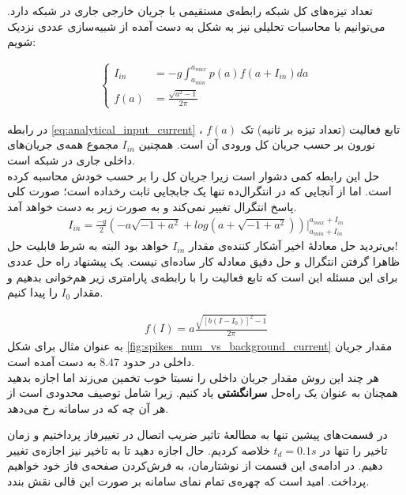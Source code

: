 تعداد تیزه‌های کل شبکه رابطه‌ی مستقیمی با جریان خارجی جاری در شبکه دارد. می‌توانیم با محاسبات تحلیلی نیز به شکل به دست آمده از شبیه‌سازی عددی نزدیک شویم:

\begin{align}
	\begin{cases}
		I_{in} &= -g \int_{a_{min}}^{a_{max}} p(a) f(a + I_{in}) da \\
		f(a) &= \frac{\sqrt{a^2 - 1}}{2\pi}
	\end{cases}
	\label{eq:analytical_input_current}
\end{align}

در رابطه \ref{eq:analytical_input_current} ، $f(a)$ تابع فعالیت (تعداد تیزه بر ثانیه) تک نورون بر حسب جریان کل ورودی آن است. همچنین $I_{in}$ مجموع همه‌ی جریان‌های داخلی جاری در شبکه است.\\

حل این رابطه کمی دشوار است زیرا جریان کل را بر حسب خودش محاسبه کرده است. اما از آنجایی که در انتگرال‌ده تنها یک جابجایی ثابت رخداده است؛ صورت کلی پاسخ انتگرال تغییر نمی‌کند و به صورت زیر به دست خواهد آمد.
\begin{align}
	I_{in} = \frac{-g}{2} (-a \sqrt{-1 + a^2} + log(a + \sqrt{-1 + a^2})) \Big|_{a_{min} + I_{in}}^{a_{max} + I_{in}}
\end{align}
بی‌تردید حل معادلهٔ اخیر آشکار کننده‌ی مقدار
$I_{in}$
خواهد بود البته به شرط قابلیت حل!\\

ظاهرا گرفتن انتگرال و حل دقیق معادله کار ساده‌ای نیست. یک پیشنهاد راه حل عددی برای این مسئله این است که تابع فعالیت را با رابطه‌ی پارامتری زیر هم‌خوانی بدهیم و مقدار 
$I_0$
را پیدا کنیم.

\begin{align}
	f(I) = a \frac{\sqrt{[b(I - I_0 )]^2 - 1}}{2\pi}
\end{align}
به عنوان مثال برای شکل
\ref{fig:spikes_num_vs_background_current}
مقدار جریان داخلی در حدود 
$8.47$
به دست آمده است.\\

هر چند این روش مقدار جریان داخلی را نسبتا خوب تخمین می‌زند اما اجازه بدهید همچنان به عنوان یک راه‌حل 
\textbf{
سرانگشتی
}
یاد کنیم. زیرا شامل توصیف محدودی است از هر آن چه که در سامانه رخ می‌دهد.

در قسمت‌های پیشین تنها به مطالعهٔ تاثیر ضریب اتصال در تغییرفاز پرداختیم و زمان تاخیر را تنها در $t_d = 0.1 s$ خلاصه کردیم. حال اجازه دهید تا به تاخیر نیز اجازه‌ی تغییر دهیم. در ادامه‌ی این قسمت از نوشتارمان، به فرش‌کردن صفحه‌ی فاز خود خواهیم پرداخت. امید است که چهره‌ی تمام نمای سامانه‌ بر صورت این قالی نقش بندد.\\



